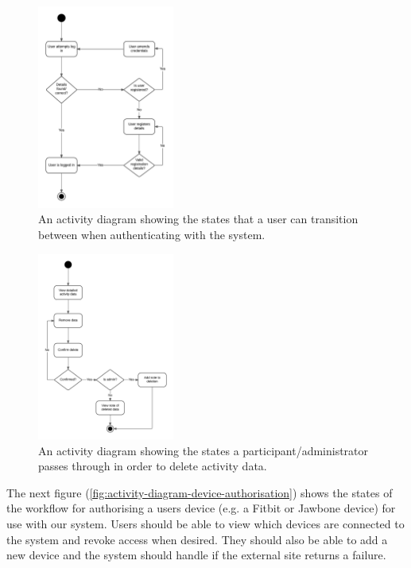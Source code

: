 \begin{figure}[H]
\centering
\includegraphics[width=0.4\textwidth]{../design/UML/StateActivity/User-Login-Registration.png}
\caption{An activity diagram showing the states that a user can transition between when authenticating with the system.}
\label{fig:activity-diagram-user-login}
\end{figure}

\begin{figure}[H]
\centering
\includegraphics[width=0.4\textwidth]{../design/UML/StateActivity/Accessing-Removing-Activity-Data.png}
\caption{An activity diagram showing the states a participant/administrator passes through in order to delete activity data.}
\label{fig:activity-diagram-accessing-removing-activity-data}
\end{figure}

The next figure (\ref{fig:activity-diagram-device-authorisation}) shows the states of the workflow for authorising a users device (e.g. a Fitbit or Jawbone device) for use with our system. Users should be able to view which devices are connected to the system and revoke access when desired. They should also be able to add a new device and the system should handle if the external site returns a failure.

